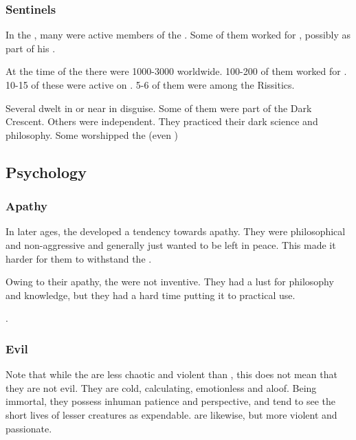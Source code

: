 \subsubsection{Sentinels}
In the , many \quiljaaran were active members of the . 
Some of them worked for , possibly as part of his . 

At the time of the \thirdbanewar there were 1000-3000 \quiljaaran worldwide. 
100-200 of them worked for \Secherdamon.
10-15 of these were active on \Azmith.
5-6 of them were among the Rissitics. 

Several \quiljaaran dwelt in or near \Yormis in disguise. 
Some of them were part of the Dark Crescent.
Others were independent.
They practiced their dark science and philosophy. 
Some worshipped the \xs (even \Ubloth) 









\subsection{Psychology}





\subsubsection{Apathy}
In later ages, the \quiljaaran developed a tendency towards apathy. 
They were philosophical and non-aggressive and generally just wanted to be left in peace. 
This made it harder for them to withstand the . 

Owing to their apathy, the \quiljaaran were not inventive. 
They had a lust for philosophy and knowledge, but they had a hard time putting it to practical use. 

. 





\subsubsection{Evil}
Note that while the \ophidians{} are less chaotic and violent than \dragons, this does not mean that they are not evil. 
They are cold, calculating, emotionless and aloof. 
Being immortal, they possess inhuman patience and perspective, and tend to see the short lives of lesser creatures as expendable. 
\Dragons{} are likewise, but more violent and passionate. 

